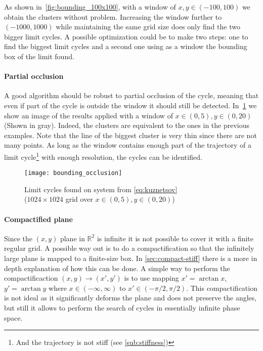 As shown in~\cref{fig:bounding_100x100}, with a window of $x,y \in (-100,100)$ we obtain the clusters without problem. Increasing the window further to $(-1000, 1000)$ while maintaining the same
grid size does only find the two bigger limit cycles.
A possible optimization could be to make two steps: one to find the biggest limit cycles and a second one using as a window the bounding box of the limit found.

\pagebreak
\paragraph{Partial occlusion}

A good algorithm should be robust to partial occlusion of the cycle, meaning that even if part of the cycle is outside the window it should still be detected. In~\cref{fig:bounding_occ} we show an image of the results applied with a window of $x \in (0, 5), y \in (0, 20)$ (Shown in gray). Indeed, the clusters are equivalent to the ones in the previous examples. Note that the line of the biggest cluster is very thin
since there are not many points. As long as the window contains enough part of the trajectory of a limit cycle\footnote{And the trajectory is not stiff (see \cref{sub:stiffness})} with enough resolution, the cycles can be identified.

\begin{figure}[H]
    \centering
    \texttt{[image: bounding\_occlusion]}
    \caption{Limit cycles found on system from \cref{eq:kuznetsov} \\
        ($1024 \times 1024$ grid over $x \in (0, 5), y \in (0, 20)$)
    }%
    \label{fig:bounding_occ}
\end{figure}

\pagebreak
\paragraph{Compactified plane}

Since the $(x,y)$ plane in $\mathbb{R}^2$ is infinite it is not possible to cover it with a finite regular grid. A possible way out is
to do a compactification so that the infinitely large plane is mapped to a finite-size box. In \cref{sec:compact-stiff} there is a more in depth explanation of how this can be done. A simple way to perform the compactificaction $(x,y)\to(x',y')$ is to use mapping $x' = \arctan x$, $y' = \arctan y$ where $x\in(-\infty, \infty)$ to $x'\in(-\pi/2, \pi/2)$. This compactification is not ideal as it significantly deforms the plane and does not preserve the angles, but still it allows to perform the search of cycles in essentially infinite phase space.

